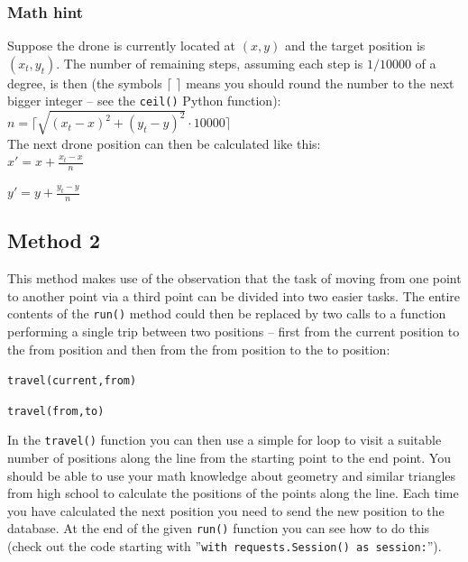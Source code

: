 \documentclass{article}
\begin{document}
\subsubsection{Math hint}

Suppose the drone is currently located at $(x,y)$ and the target position is $(x_t,y_t)$. The number of remaining steps, assuming each step is $1/10000$ of a degree, is then (the symbols $\lceil$ $\rceil$ means you should round the number to the next bigger integer -- see the \texttt{ceil()} Python function):\\

\begin{math}
n = \lceil \sqrt{(x_t-x)^2+(y_t-y)^2} \cdot 10000 \rceil
\end{math}
\\

\noindent The next drone position can then be calculated like this:\\

\begin{math}
x' = x + \frac{x_t - x}{n}
\end{math}

\begin{math}
y' = y + \frac{y_t - y}{n}
\end{math}

\subsection{Method 2}

This method makes use of the observation that the task of moving from one point to another point via a third point can be divided into two easier tasks. The entire contents of the \texttt{run()} method could then be replaced by two calls to a function performing a single trip between two positions -- first from the current position to the from position and then from the from position to the to position:

\vspace{2mm}

\texttt{travel(current,from)}


\texttt{travel(from,to)}

\vspace{2mm}

In the \texttt{travel()} function you can then use a simple for loop to visit a suitable number of positions along the line from the starting point to the end point. You should be able to use your math knowledge about geometry and similar triangles from high school to calculate the positions of the points along the line. Each time you have calculated the next position you need to send the new position to the database. At the end of the given \texttt{run()} function you can see how to do this (check out the code starting with ''\texttt{with requests.Session() as session:}'').
\end{document}
